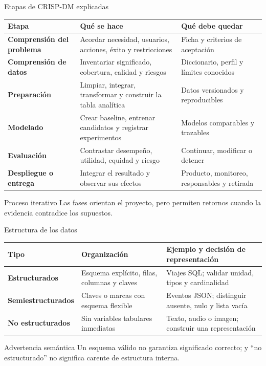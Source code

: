 \documentclass[aspectratio=169,11pt]{beamer}
\begin{document}
\begin{frame}{Etapas de CRISP-DM explicadas}
  \scriptsize
  \begin{tabularx}{\textwidth}{>{\bfseries}p{} X X}
    \toprule
    Etapa & Qué se hace & Qué debe quedar \\
    \midrule
    Comprensión del problema & Acordar necesidad, usuarios, acciones, éxito y restricciones & Ficha y criterios de aceptación \\
    Comprensión de datos & Inventariar significado, cobertura, calidad y riesgos & Diccionario, perfil y límites conocidos \\
    Preparación & Limpiar, integrar, transformar y construir la tabla analítica & Datos versionados y reproducibles \\
    Modelado & Crear baseline, entrenar candidatos y registrar experimentos & Modelos comparables y trazables \\
    Evaluación & Contrastar desempeño, utilidad, equidad y riesgo & Continuar, modificar o detener \\
    Despliegue o entrega & Integrar el resultado y observar sus efectos & Producto, monitoreo, responsables y retirada \\
    \bottomrule
  \end{tabularx}
  \vfill
  \begin{block}{Proceso iterativo}
    Las fases orientan el proyecto, pero permiten retornos cuando la evidencia contradice los supuestos.
  \end{block}
\end{frame}

\begin{frame}{Estructura de los datos}
  \small
  \begin{tabularx}{\textwidth}{>{\bfseries}p{} X X}
    \toprule
    Tipo & Organización & Ejemplo y decisión de representación \\
    \midrule
    Estructurados & Esquema explícito, filas, columnas y claves & Viajes SQL; validar unidad, tipos y cardinalidad \\
    Semiestructurados & Claves o marcas con esquema flexible & Eventos JSON; distinguir ausente, nulo y lista vacía \\
    No estructurados & Sin variables tabulares inmediatas & Texto, audio o imagen; construir una representación \\
    \bottomrule
  \end{tabularx}
  \vfill
  \begin{block}{Advertencia semántica}
    Un esquema válido no garantiza significado correcto; y ``no estructurado'' no significa carente de estructura interna.
  \end{block}
\end{frame}
\end{document}
